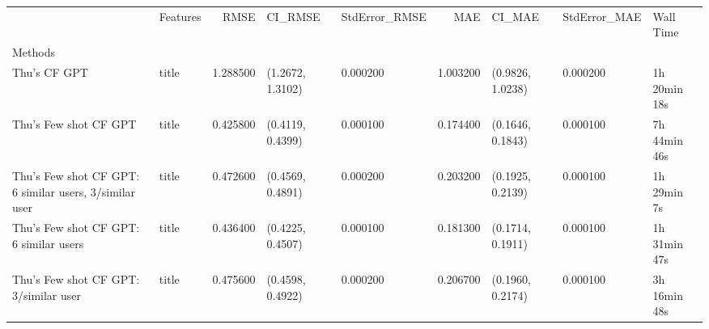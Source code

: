 \begin{tabular}{llrllrlll}
 & Features & RMSE & CI_RMSE & StdError_RMSE & MAE & CI_MAE & StdError_MAE & Wall Time \\
Methods &  &  &  &  &  &  &  &  \\
Thu's CF GPT & title & 1.288500 & (1.2672, 1.3102) & 0.000200 & 1.003200 & (0.9826, 1.0238) & 0.000200 & 1h 20min 18s \\
Thu's Few shot CF GPT & title & 0.425800 & (0.4119, 0.4399) & 0.000100 & 0.174400 & (0.1646, 0.1843) & 0.000100 & 7h 44min 46s \\
Thu's Few shot CF GPT: 6 similar users, 3/similar user & title & 0.472600 & (0.4569, 0.4891) & 0.000200 & 0.203200 & (0.1925, 0.2139) & 0.000100 & 1h 29min 7s \\
Thu's Few shot CF GPT: 6 similar users & title & 0.436400 & (0.4225, 0.4507) & 0.000100 & 0.181300 & (0.1714, 0.1911) & 0.000100 & 1h 31min 47s \\
Thu's Few shot CF GPT: 3/similar user & title & 0.475600 & (0.4598, 0.4922) & 0.000200 & 0.206700 & (0.1960, 0.2174) & 0.000100 & 3h 16min 48s \\
\end{tabular}
